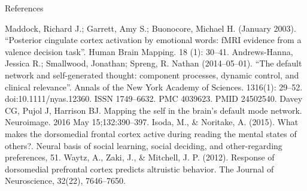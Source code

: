 \documentclass[twocolumn]{article}
\begin{document}
\pagebreak


References


Maddock, Richard J.; Garrett, Amy S.; Buonocore, Michael H. (January 2003). “Posterior cingulate cortex activation by emotional words: fMRI evidence from a valence decision task”. Human Brain Mapping. 18 (1): 30–41.
Andrews-Hanna, Jessica R.; Smallwood, Jonathan; Spreng, R. Nathan (2014–05–01). “The default network and self-generated thought: component processes, dynamic control, and clinical relevance”. Annals of the New York Academy of Sciences. 1316(1): 29–52. doi:10.1111/nyas.12360. ISSN 1749–6632. PMC 4039623. PMID 24502540.
Davey CG, Pujol J, Harrison BJ. Mapping the self in the brain’s default mode network. Neuroimage. 2016 May 15;132:390–397.
Isoda, M., \& Noritake, A. (2015). What makes the dorsomedial frontal cortex active during reading the mental states of others?. Neural basis of social learning, social deciding, and other-regarding preferences, 51.
Waytz, A., Zaki, J., \& Mitchell, J. P. (2012). Response of dorsomedial prefrontal cortex predicts altruistic behavior. The Journal of Neuroscience, 32(22), 7646–7650.
\end{document}
